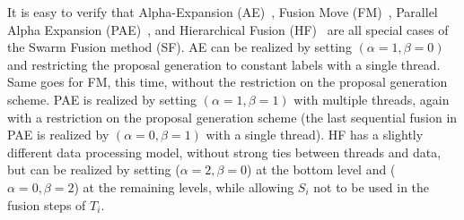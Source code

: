 \noindent It is easy to verify that Alpha-Expansion
(AE)~\cite{alpha_expansion}, Fusion Move (FM)~\cite{fusion_moves_for_markov_random_field_optimization}, Parallel
Alpha Expansion (PAE)~\cite{fusion_moves_for_markov_random_field_optimization}, and Hierarchical Fusion
(HF)~\cite{delong_hierarchical_fusion,olga_hierarchical_alpha_expansion} are all special cases of the Swarm
Fusion method (SF). AE can be realized by setting $(\alpha=1, \beta=0)$ and
restricting the proposal generation to constant labels with a single
thread. Same goes for FM, this time, without the restriction on the
proposal generation scheme. PAE is realized by setting
$(\alpha=1,\beta=1)$  with multiple threads, again with a restriction on
the proposal generation scheme (the last sequential fusion in PAE is
realized by $(\alpha=0, \beta=1)$ with a single thread).
%
HF has a slightly different data processing model, without strong ties
between threads and data, but can be realized by setting ($\alpha=2,
\beta=0$) at the bottom level and ($\alpha=0, \beta=2$) at the remaining
levels, while allowing $S_i$ not to be used in the fusion steps of
$T_i$.





%

